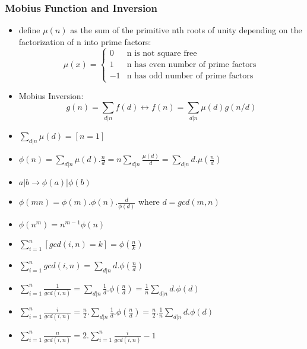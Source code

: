 \subsubsection{Mobius Function and Inversion}
\vspace{2.5mm}
\begin{itemize}
    \item define $\mu(n)$ as the sum of the primitive nth roots of unity depending on the
          factorization of n into prime factors:
          \[
              \mu(x) =
              \begin{cases}
                  0  & \text{n is not square free}               \\
                  1  & \text{n has even number of prime factors} \\
                  -1 & \text{n has odd number of prime factors}
              \end{cases}
          \]
    \item Mobius Inversion: $$g(n) = \sum_{d|n}f(d)\leftrightarrow f(n) =
              \sum_{d|n}\mu(d)g(n/d)$$
    \item $\sum\limits_{d|n}\mu(d) = [n=1]$
    \item $\phi(n) = \sum\limits_{d|n} \mu(d).\frac{n}{d} = n\sum\limits_{d|n}\frac{\mu(d)}{d} = \sum\limits_{d|n}d.\mu(\frac{n}{d})$
    \item $a|b \rightarrow \phi(a)|\phi(b)$
    \item $\phi(mn) = \phi(m).\phi(n).\frac{d}{\phi(d)}$ where $d = gcd(m,n)$
    \item $\phi(n^m) = n^{m-1}\phi(n)$
    \item $\sum\limits_{i=1}^n[gcd(i,n)=k] = \phi(\frac{n}{k})$
    \item $\sum\limits_{i=1}^n gcd(i,n) = \sum\limits_{d|n}d.\phi(\frac{n}{d})$

    \item $\sum\limits_{i=1}^n \frac{1}{gcd(i,n)} = \sum\limits_{d|n}\frac{1}{d}.\phi(\frac{n}{d}) = \frac{1}{n}\sum\limits_{d|n}d.\phi(d)$

    \item $\sum\limits_{i=1}^n \frac{i}{gcd(i,n)} = \frac{n}{2}.\sum\limits_{d|n}\frac{1}{d}.\phi(\frac{n}{d}) = \frac{n}{2}.\frac{1}{n}\sum\limits_{d|n}d.\phi(d)$

    \item $\sum\limits_{i=1}^n \frac{n}{gcd(i,n)} = 2.\sum\limits_{i=1}^n \frac{i}{gcd(i,n)} - 1$
\end{itemize}
